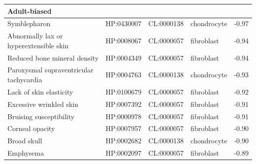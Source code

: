 \documentclass[
]{article}
\begin{document}
\begin{table}
{\begin{tabular}[t]{l|l|l|l|r}
\hline
\multicolumn{5}{l}{\textbf{Adult-biased}}\\
\hline
\hspace{1em}Symblepharon & HP:0430007 & CL:0000138 & chondrocyte & -0.97\\
\hline
\hspace{1em}Abnormally lax or hyperextensible skin & HP:0008067 & CL:0000057 & fibroblast & -0.94\\
\hline
\hspace{1em}Reduced bone mineral density & HP:0004349 & CL:0000057 & fibroblast & -0.94\\
\hline
\hspace{1em}Paroxysmal supraventricular tachycardia & HP:0004763 & CL:0000138 & chondrocyte & -0.93\\
\hline
\hspace{1em}Lack of skin elasticity & HP:0100679 & CL:0000057 & fibroblast & -0.92\\
\hline
\hspace{1em}Excessive wrinkled skin & HP:0007392 & CL:0000057 & fibroblast & -0.91\\
\hline
\hspace{1em}Bruising susceptibility & HP:0000978 & CL:0000057 & fibroblast & -0.91\\
\hline
\hspace{1em}Corneal opacity & HP:0007957 & CL:0000057 & fibroblast & -0.90\\
\hline
\hspace{1em}Broad skull & HP:0002682 & CL:0000138 & chondrocyte & -0.90\\
\hline
\hspace{1em}Emphysema & HP:0002097 & CL:0000057 & fibroblast & -0.89\\
\hline
\end{tabular}

}

\end{table}%

\newpage
\end{document}
